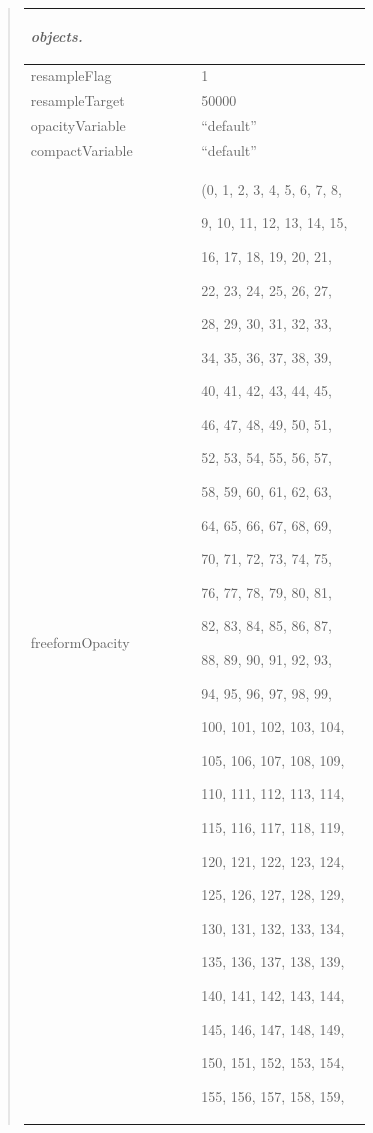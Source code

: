 \documentclass[letterpaper,10pt,english]{sphinxmanual}
\begin{document}
\begin{quote}
\begin{longtable}{|p{0.475\linewidth}|p{0.475\linewidth}|}
\begin{DUlineblock}{0em}
\item[] \emph{objects.}
\end{DUlineblock}
\\
\hline
resampleFlag
 & 
1
\\
\hline
resampleTarget
 & 
50000
\\
\hline
opacityVariable
 & 
``default''
\\
\hline
compactVariable
 & 
``default''
\\
\hline
freeformOpacity
 & 
\begin{DUlineblock}{0em}
\item[] (0, 1, 2, 3, 4, 5, 6, 7, 8,
\item[] 9, 10, 11, 12, 13, 14, 15,
\item[] 16, 17, 18, 19, 20, 21,
\item[] 22, 23, 24, 25, 26, 27,
\item[] 28, 29, 30, 31, 32, 33,
\item[] 34, 35, 36, 37, 38, 39,
\item[] 40, 41, 42, 43, 44, 45,
\item[] 46, 47, 48, 49, 50, 51,
\item[] 52, 53, 54, 55, 56, 57,
\item[] 58, 59, 60, 61, 62, 63,
\item[] 64, 65, 66, 67, 68, 69,
\item[] 70, 71, 72, 73, 74, 75,
\item[] 76, 77, 78, 79, 80, 81,
\item[] 82, 83, 84, 85, 86, 87,
\item[] 88, 89, 90, 91, 92, 93,
\item[] 94, 95, 96, 97, 98, 99,
\item[] 100, 101, 102, 103, 104,
\item[] 105, 106, 107, 108, 109,
\item[] 110, 111, 112, 113, 114,
\item[] 115, 116, 117, 118, 119,
\item[] 120, 121, 122, 123, 124,
\item[] 125, 126, 127, 128, 129,
\item[] 130, 131, 132, 133, 134,
\item[] 135, 136, 137, 138, 139,
\item[] 140, 141, 142, 143, 144,
\item[] 145, 146, 147, 148, 149,
\item[] 150, 151, 152, 153, 154,
\item[] 155, 156, 157, 158, 159,

\end{DUlineblock}
\end{longtable}
\end{quote}
\end{document}
